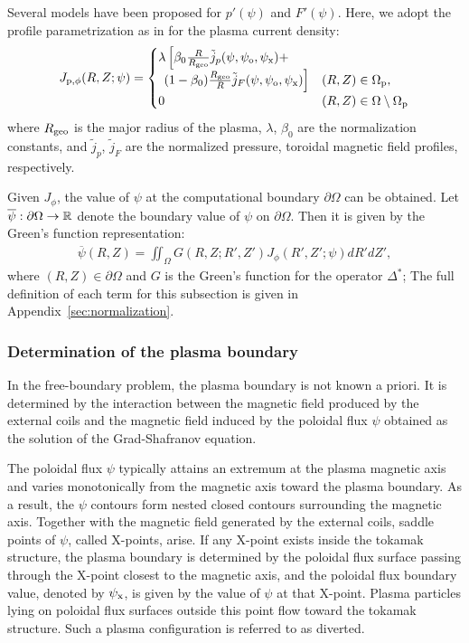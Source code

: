 Several models have been proposed for $p'(\psi)$ and $F'(\psi)$. 
Here, we adopt the profile parametrization as in \cite{Luxon_1982} 
for the plasma current density:
\begin{align}\label{eq:currentdensity}
  \begin{aligned}
  J_{\text{p}, \phi}(R, Z; \psi) = \begin{cases}
  \lambda \left[\beta_0 \frac{R}{R_{\textrm{geo}}}\tilde{j}_p(\psi, \psi_{\text{o}}, \psi_{\text{x}}) + \right. & \\
  \ \left. (1-\beta_0) \frac{R_{\textrm{geo}}}{R}\tilde{j}_F(\psi, \psi_{\text{o}}, \psi_{\text{x}})\right] 
  & (R, Z) \in \Omega_{\textrm{p}}, \\
  0 & (R, Z) \in \Omega \setminus \Omega_{\textrm{p}}
  \end{cases}
  \end{aligned}
\end{align}
where $R_{\text{geo}}$ is the major radius of the plasma,
$\lambda$, $\beta_0$ are the normalization constants, 
and $\tilde{j}_p$, $\tilde{j}_F$ are the normalized pressure,
toroidal magnetic field profiles, respectively.

Given $J_\phi$, the value of $\psi$ at the computational boundary $\partial \Omega$
can be obtained.
Let $\overline{\psi}: \partial \Omega \to \mathbb{R}$ denote the boundary value of $\psi$ on $\partial \Omega$.
Then it is given by the Green's function representation:
\begin{align}\label{eq:4}
  \overline{\psi}(R, Z) = \iint_{\Omega}  G(R, Z; R', Z') J_\phi(R', Z'; \psi) dR' dZ',
\end{align} 
where $(R, Z) \in \partial \Omega$ and $G$ is the Green's function for the operator $\Delta^*$;
The full definition of each term for this subsection is given in Appendix~\ref{sec:normalization}.

\subsubsection{Determination of the plasma boundary} \label{sec:2.1.2}

In the free-boundary problem, the plasma boundary is not known a priori.
It is determined by the interaction between the magnetic field
produced by the external coils and the magnetic field induced by the poloidal flux
$\psi$ obtained as the solution of the Grad-Shafranov equation.

The poloidal flux $\psi$ typically attains an extremum at the plasma
magnetic axis and varies monotonically from the magnetic axis toward the plasma boundary.
As a result, the $\psi$ contours form nested closed contours surrounding the magnetic axis.
Together with the magnetic field generated by the external coils,
saddle points of $\psi$, called X-points, arise.
If any X-point exists inside the tokamak structure,
the plasma boundary is determined by the poloidal flux surface passing through
the X-point closest to the magnetic axis,
and the poloidal flux boundary value, denoted by $\psi_{\text{x}}$, 
is given by the value of $\psi$ at that X-point.
Plasma particles lying on poloidal flux surfaces outside this point
flow toward the tokamak structure.
Such a plasma configuration is referred to as diverted.

